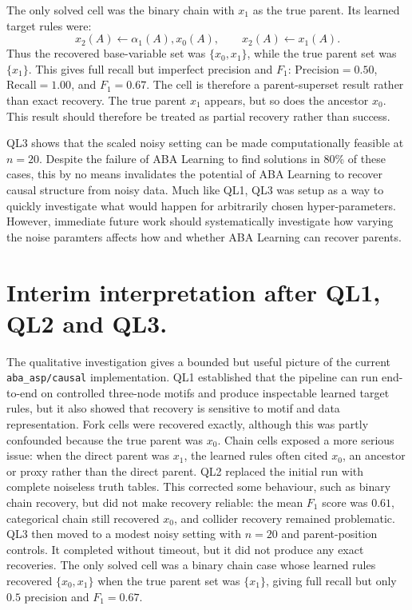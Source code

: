 The only solved cell was the binary chain with \(x_1\) as the true parent. Its learned target rules were:
\[
x_2(A) \leftarrow \alpha_1(A), x_0(A),
\qquad
x_2(A) \leftarrow x_1(A).
\]
Thus the recovered base-variable set was \(\{x_0,x_1\}\), while the true parent set was \(\{x_1\}\). This gives full recall but imperfect precision and \(F_1\): \(\mathrm{Precision}=0.50\), \(\mathrm{Recall}=1.00\), and \(F_1=0.67\). The cell is therefore a parent-superset result rather than exact recovery. The true parent \(x_1\) appears, but so does the ancestor \(x_0\). This result should therefore be treated as partial recovery rather than success.


QL3 shows that the scaled noisy setting can be made computationally feasible at \(n=20\). Despite the failure of ABA Learning to find solutions in 80\% of these cases, this by no means invalidates the potential of ABA Learning to recover causal structure from noisy data. Much like QL1, QL3 was setup as a way to quickly investigate what would happen for arbitrarily chosen hyper-parameters. However, immediate future work should systematically investigate how varying the noise paramters affects how and whether ABA Learning can recover parents.

\section{Interim interpretation after QL1, QL2 and QL3.}
The qualitative investigation gives a bounded but useful picture of the current \texttt{aba\_asp/causal} implementation. QL1 established that the pipeline can run end-to-end on controlled three-node motifs and produce inspectable learned target rules, but it also showed that recovery is sensitive to motif and data representation. Fork cells were recovered exactly, although this was partly confounded because the true parent was \(x_0\). Chain cells exposed a more serious issue: when the direct parent was \(x_1\), the learned rules often cited \(x_0\), an ancestor or proxy rather than the direct parent. QL2 replaced the initial run with complete noiseless truth tables. This corrected some behaviour, such as binary chain recovery, but did not make recovery reliable: the mean \(F_1\) score was \(0.61\), categorical chain still recovered \(x_0\), and collider recovery remained problematic. QL3 then moved to a modest noisy setting with \(n=20\) and parent-position controls. It completed without timeout, but it did not produce any exact recoveries. The only solved cell was a binary chain case whose learned rules recovered \(\{x_0,x_1\}\) when the true parent set was \(\{x_1\}\), giving full recall but only \(0.5\) precision and \(F_1=0.67\).

